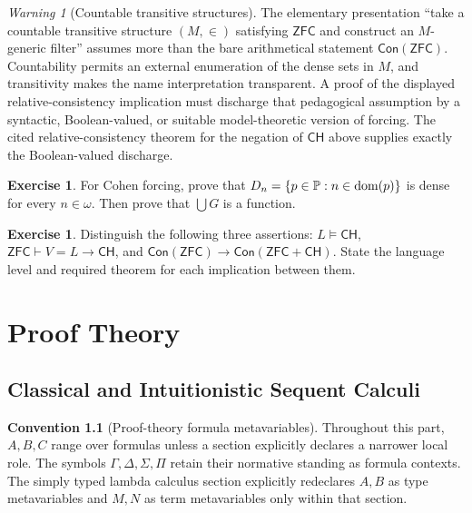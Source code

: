 \documentclass[11pt,oneside,openany]{book}
\theoremstyle{definition}
\newtheorem{exercise}[definition]{Exercise}
\newtheorem{convention}[definition]{Convention}
\theoremstyle{plain}
\theoremstyle{remark}
\newtheorem{warning}[definition]{Warning}
\DeclarePairedDelimiter{\set}{\lbrace}{\rbrace}
\newcommand{\dom}{\operatorname{dom}}
\newcommand{\entails}{\models}
\newcommand{\derives}{\vdash}
\newcommand{\ZFC}{\mathsf{ZFC}}
\begin{document}
\begin{warning}[Countable transitive structures]
The elementary presentation ``take a countable transitive structure
\((M,\in)\) satisfying \(\ZFC\) and construct an \(M\)-generic filter''
assumes more than the bare
arithmetical statement \(\mathsf{Con}(\ZFC)\).  Countability permits an
external enumeration of the dense sets in \(M\), and transitivity makes the
name interpretation transparent.  A proof of the displayed
relative-consistency implication must discharge that pedagogical assumption
by a
syntactic, Boolean-valued, or suitable model-theoretic version of forcing.
The cited relative-consistency theorem for the negation of \(\mathsf{CH}\)
above supplies exactly the Boolean-valued discharge.
\end{warning}

\begin{exercise}
\label{ex:constructibility-forcing-01}
For Cohen forcing, prove that
\(D_n=\set{p\in\mathbb P:n\in\dom(p)}\) is dense for every \(n\in\omega\).
Then prove that \(\bigcup G\) is a function.
\end{exercise}

\begin{exercise}
\label{ex:constructibility-forcing-02}
Distinguish the following three assertions: \(L\entails\mathsf{CH}\),
\(\ZFC\derives V=L\to\mathsf{CH}\), and
\(\mathsf{Con}(\ZFC)\to\mathsf{Con}(\ZFC+\mathsf{CH})\).
State the language level and required theorem for each implication between
them.
\end{exercise}

\part{Proof Theory}
\label{part:proof-theory}

\chapter[Classical and Intuitionistic Calculi]{Classical and Intuitionistic Sequent Calculi}
\label{ch:lk-lj}

\begin{convention}[Proof-theory formula metavariables]
Throughout this part, \(A,B,C\) range over formulas unless a section explicitly
declares a narrower local role.  The symbols \(\Gamma,\Delta,\Sigma,\Pi\)
retain their normative standing as formula contexts.  The simply typed lambda
calculus section explicitly redeclares \(A,B\) as type metavariables and
\(M,N\) as term metavariables only within that section.
\end{convention}
\end{document}
